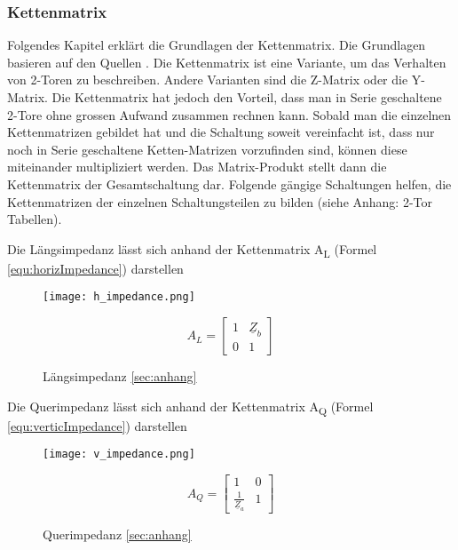 \subsubsection{Kettenmatrix}\label{subsubsec:kettenmatrix}
Folgendes Kapitel erklärt die Grundlagen der Kettenmatrix. Die Grundlagen basieren auf den Quellen \cite{hftech}\cite{Bernstein2015}.
Die Kettenmatrix ist eine Variante, um das Verhalten von 2-Toren zu beschreiben. Andere Varianten sind die Z-Matrix oder die Y-Matrix. Die Kettenmatrix hat jedoch den Vorteil, dass man in Serie geschaltene 2-Tore ohne grossen Aufwand zusammen rechnen kann. Sobald man die einzelnen Kettenmatrizen gebildet hat und die Schaltung soweit vereinfacht ist, dass nur noch in Serie geschaltene Ketten-Matrizen vorzufinden sind, können diese miteinander multipliziert werden. Das Matrix-Produkt stellt dann die Kettenmatrix der Gesamtschaltung dar. Folgende gängige Schaltungen helfen, die Kettenmatrizen der einzelnen Schaltungsteilen zu bilden (siehe Anhang: 2-Tor Tabellen).

Die Längsimpedanz lässt sich anhand der Kettenmatrix A\textsubscript{L} (Formel \ref{equ:horizImpedance}) darstellen
\begin{figure}[H]
	\begin{minipage}[h]{0.45\linewidth}
		\centering
		\texttt{[image: h\_impedance.png]}
		\caption{Längsimpedanz \ref{sec:anhang}}
	\end{minipage}
	\begin{minipage}[h]{0.45\linewidth}
		\centering
		\begin{equation}\label{equ:horizImpedance}
			A_L = \left[\begin{matrix}
			1&\underline{Z}_b\\0&1
			\end{matrix}\right]
		\end{equation}
	\end{minipage}
\end{figure}

Die Querimpedanz lässt sich anhand der Kettenmatrix A\textsubscript{Q} (Formel \ref{equ:verticImpedance}) darstellen

\begin{figure}[H]
	\begin{minipage}[h]{0.45\linewidth}
		\centering
		\texttt{[image: v\_impedance.png]}
		\caption{Querimpedanz \ref{sec:anhang}}
	\end{minipage}
	\begin{minipage}[h]{0.45\linewidth}
		\centering
		\begin{equation}\label{equ:verticImpedance}
			A_Q = \left[\begin{matrix}
			1&0\\\frac{1}{\underline{Z}_a}&1
			\end{matrix}\right]
		\end{equation}
	\end{minipage}
\end{figure}


